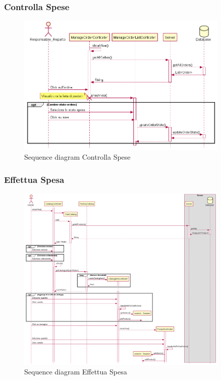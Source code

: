 \documentclass[12pt, a4paper]{report}
\begin{document}
\newpage

\subsubsection{Controlla Spese}

\begin{figure}[h]
  \centering
  \includegraphics[width=0.9\textwidth]{sequence_controllo_spese.png}
  \caption{Sequence diagram Controlla Spese}
\end{figure}

\newpage

\subsubsection{Effettua Spesa}

\begin{figure}[h]
  \centering
  \includegraphics[width=0.9\textwidth]{sequence_effettua_spesa.png}
  \caption{Sequence diagram Effettua Spesa}
\end{figure}
\end{document}
